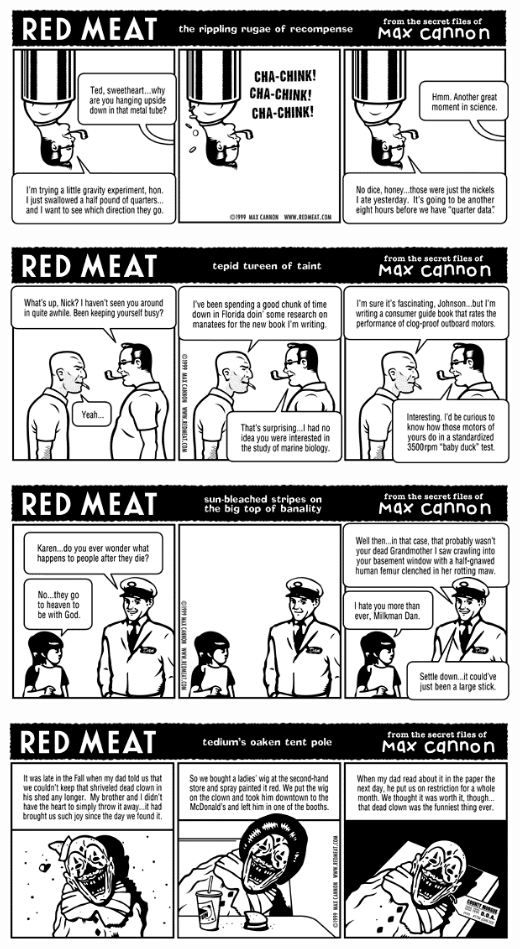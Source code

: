 \documentclass[a4paper,twoside,11pt]{article}
\begin{document}
\includegraphics[width=\textwidth]{redmeat_1999-06-07.png}



\includegraphics[width=\textwidth]{redmeat_1999-06-14.png}



\includegraphics[width=\textwidth]{redmeat_1999-06-21.png}



\includegraphics[width=\textwidth]{redmeat_1999-06-28.png}
\end{document}
